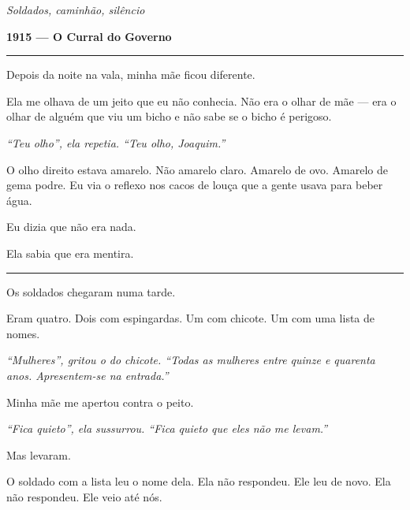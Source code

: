 
\noindent \textit{Soldados, caminhão, silêncio}

\noindent \textbf{1915 --- O Curral do Governo}

\vspace{0.5em}\noindent\rule{\textwidth}{0.5pt}\vspace{0.5em}

\noindent Depois da noite na vala, minha mãe ficou diferente.

\noindent Ela me olhava de um jeito que eu não conhecia. Não era o olhar de mãe --- era o olhar de alguém que viu um bicho e não sabe se o bicho é perigoso.

\noindent \textit{\textquotedblleft{}Teu olho\textquotedblright{}\textit{, ela repetia. }\textquotedblleft{}Teu olho, Joaquim.\textquotedblright{}}

\noindent O olho direito estava amarelo. Não amarelo claro. Amarelo de ovo. Amarelo de gema podre. Eu via o reflexo nos cacos de louça que a gente usava para beber água.

\noindent Eu dizia que não era nada.

\noindent Ela sabia que era mentira.

\vspace{0.5em}\noindent\rule{\textwidth}{0.5pt}\vspace{0.5em}

\noindent Os soldados chegaram numa tarde.

\noindent Eram quatro. Dois com espingardas. Um com chicote. Um com uma lista de nomes.

\noindent \textit{\textquotedblleft{}Mulheres\textquotedblright{}\textit{, gritou o do chicote. }\textquotedblleft{}Todas as mulheres entre quinze e quarenta anos. Apresentem-se na entrada.\textquotedblright{}}

\noindent Minha mãe me apertou contra o peito.

\noindent \textit{\textquotedblleft{}Fica quieto\textquotedblright{}\textit{, ela sussurrou. }\textquotedblleft{}Fica quieto que eles não me levam.\textquotedblright{}}

\noindent Mas levaram.

\noindent O soldado com a lista leu o nome dela. Ela não respondeu. Ele leu de novo. Ela não respondeu. Ele veio até nós.


